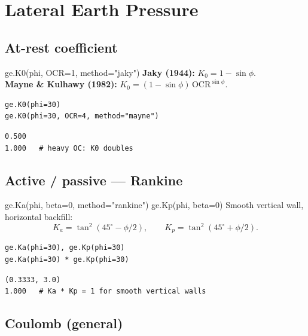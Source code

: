 \documentclass[11pt,a4paper,openany]{book}
\begin{document}
\chapter{Lateral Earth Pressure}\label{ch:earth}

\section{At-rest coefficient}

\begin{funcbox}{ge.K0(phi, OCR=1, method="jaky")}
\textbf{Jaky (1944):} $K_0 = 1 - \sin\phi$.\\
\textbf{Mayne \& Kulhawy (1982):}
$K_0 = (1 - \sin\phi)\,\mathrm{OCR}^{\sin\phi}$.
\end{funcbox}

\begin{lstlisting}
ge.K0(phi=30)
ge.K0(phi=30, OCR=4, method="mayne")
\end{lstlisting}
\begin{lstlisting}[style=output]
0.500
1.000   # heavy OC: K0 doubles
\end{lstlisting}

\section{Active / passive --- Rankine}

\begin{funcbox}{ge.Ka(phi, beta=0, method="rankine") \quad ge.Kp(phi, beta=0)}
Smooth vertical wall, horizontal backfill:
\[
K_a = \tan^2(45^\circ - \phi/2),\qquad
K_p = \tan^2(45^\circ + \phi/2).
\]
\end{funcbox}

\begin{lstlisting}
ge.Ka(phi=30), ge.Kp(phi=30)
ge.Ka(phi=30) * ge.Kp(phi=30)
\end{lstlisting}
\begin{lstlisting}[style=output]
(0.3333, 3.0)
1.000   # Ka * Kp = 1 for smooth vertical walls
\end{lstlisting}

\section{Coulomb (general)}
\end{document}
